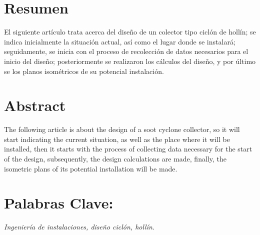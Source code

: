 \documentclass[12pt,spanish,Letterpaper,openany]{book}
\begin{document}
\hypertarget{resumen-3}{%
\section*{Resumen}\label{resumen-3}}

El siguiente artículo trata acerca del diseño de un colector tipo ciclón de hollín; se indica inicialmente la situación actual, así como el lugar donde se instalará; seguidamente, se inicia con el proceso de recolección de datos necesarios para el inicio del diseño; posteriormente se realizaron los cálculos del diseño, y por último se los planos isométricos de su potencial instalación.

\hypertarget{abstract-3}{%
\section*{Abstract}\label{abstract-3}}

The following article is about the design of a soot cyclone collector, so it will start indicating the current situation, as well as the place where it will be installed, then it starts with the process of collecting data necessary for the start of the design, subsequently, the design calculations are made, finally, the isometric plans of its potential installation will be made.

\hypertarget{palabras-clave-4}{%
\section*{Palabras Clave:}\label{palabras-clave-4}}

\emph{Ingeniería de instalaciones, diseño ciclón, hollín.}
\end{document}
